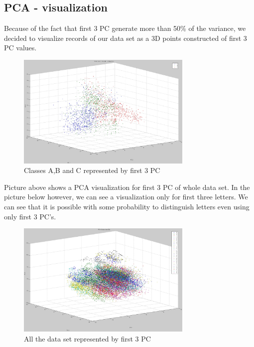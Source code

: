 \subsection*{PCA - visualization}
Because of the fact that first 3 PC generate more than 50\% of the variance, we
decided to visualize records of our data set as a 3D points constructed of first
3 PC values. 
\begin{figure}[!tbh]
	\centering
	\includegraphics[width=0.75\textwidth]{figures/pca_points_abc_3D}
	\caption{Classes A,B and C represented by first 3 PC}
	\label{fig:pca_points_abc_3D}
\end{figure} 
Picture above shows a PCA visualization for first 3 PC of whole data set. 
In the picture below however, we can see a visualization only for first
three letters. We can see that it is possible with some probability 
to distinguish letters even using only first 3 PC's.
\begin{figure}[!tbh]
	\centering
	\includegraphics[width=0.75\textwidth]{figures/pca_points_all_3D}
	\caption{All the data set represented by first 3 PC}
	\label{fig:pca_points_all_3D}
\end{figure}

